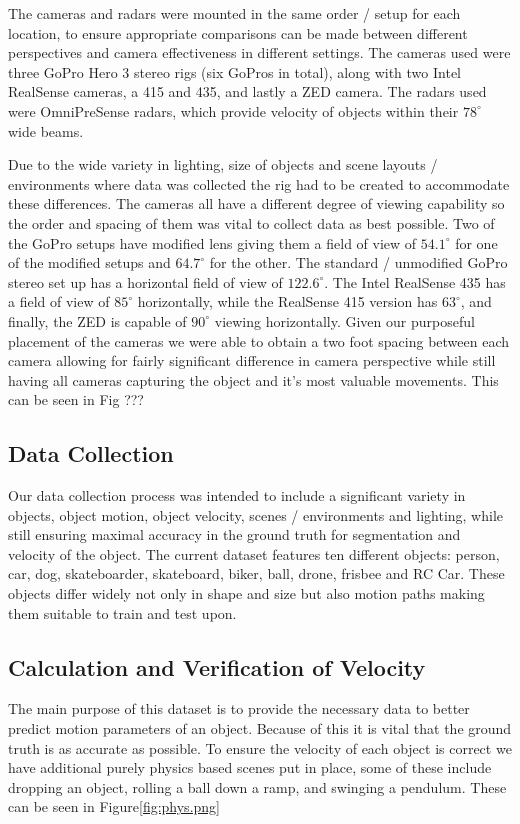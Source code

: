 The cameras and radars were mounted in the same order / setup for each location, to ensure appropriate comparisons can be made between different perspectives and camera effectiveness in different settings. 
The cameras used were three GoPro Hero 3 stereo rigs (six GoPros in total), along with two Intel RealSense cameras, a 415 and 435, and lastly a ZED camera. 
The radars used were OmniPreSense radars, which provide velocity of objects within their $78^{\circ}$ wide beams.

Due to the wide variety in lighting, size of objects and scene layouts / environments where data was collected the rig had to be created to accommodate these differences. 
The cameras all have a different degree of viewing capability so the order and spacing of them was vital to collect data as best possible. 
Two of the GoPro setups have modified lens giving them a field of view of $54.1^{\circ}$ for one of the modified setups and $64.7^{\circ}$ for the other.
The standard / unmodified GoPro stereo set up has a horizontal field of view of $122.6^{\circ}$.
The Intel RealSense 435 has a field of view of $85^{\circ}$ horizontally, while the RealSense 415 version has $63^{\circ}$, and finally, the ZED is capable of $90^{\circ}$ viewing horizontally.
Given our purposeful placement of the cameras we were able to obtain a two foot spacing between each camera allowing for fairly significant difference in camera perspective while still having all cameras capturing the object and it's most valuable movements. 
This can be seen in Fig ???

\subsection{Data Collection}
Our data collection process was intended to include a significant variety in objects, object motion, object velocity, scenes / environments and lighting, while still ensuring maximal accuracy in the ground truth for segmentation and velocity of the object.
The current dataset features ten different objects: person, car, dog, skateboarder, skateboard, biker, ball, drone, frisbee and RC Car. 
These objects differ widely not only in shape and size but also motion paths making them suitable to train and test upon. 

\subsection{Calculation and Verification of Velocity}
The main purpose of this dataset is to provide the necessary data to better predict motion parameters of an object. 
Because of this it is vital that the ground truth is as accurate as possible. 
To ensure the velocity of each object is correct we have additional purely physics based scenes put in place, some of these include dropping an object, rolling a ball down a ramp, and swinging a pendulum.
These can be seen in Figure\ref{fig:phys.png}

